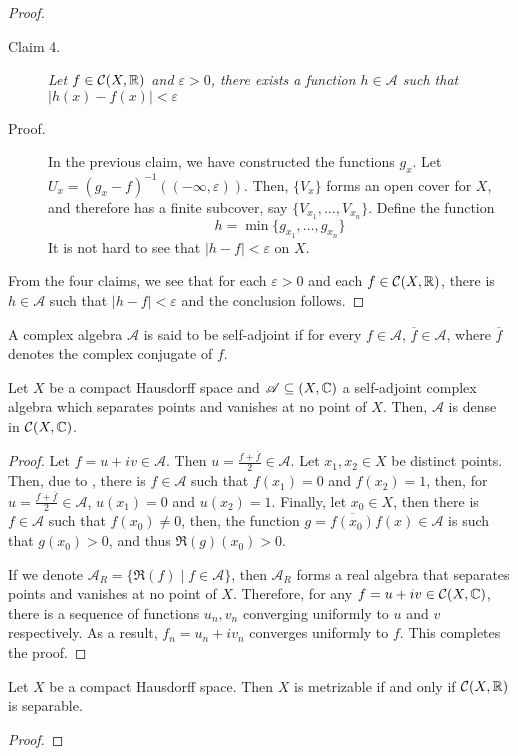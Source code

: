 \begin{proof}
\begin{description}
\item[Claim 4.]\itshape Let $f\in\mathcal C(X,\mathbb{R})$ and $\varepsilon > 0$, there exists a function $h\in\mathscr A$ such that $|h(x) - f(x)| < \varepsilon$\normalfont
\item[Proof.] In the previous claim, we have constructed the functions $g_x$. Let $U_x = (g_x - f)^{-1}((-\infty,\varepsilon))$. Then, $\{V_x\}$ forms an open cover for $X$, and therefore has a finite subcover, say $\{V_{x_1},\ldots,V_{x_n}\}$. Define the function 
\begin{equation*}
    h = \min\{g_{x_1},\ldots,g_{x_n}\}
\end{equation*}
It is not hard to see that $|h - f| < \varepsilon$ on $X$.
\end{description}

From the four claims, we see that for each $\varepsilon > 0$ and each $f\in\mathcal C(X,\mathbb{R})$, there is $h\in\mathscr A$ such that $|h - f| < \varepsilon$ and the conclusion follows.
\end{proof}

\begin{definition}
    A complex algebra $\mathscr A$ is said to be self-adjoint if for every $f\in\mathscr A$, $\overline f\in\mathscr A$, where $\overline f$ denotes the complex conjugate of $f$.
\end{definition}

\begin{theorem}
    Let $X$ be a compact Hausdorff space and $\mathscr A\subseteq\mathcal(X,\mathbb{C})$ a self-adjoint complex algebra which separates points and vanishes at no point of $X$. Then, $\mathscr A$ is dense in $\mathcal C(X,\mathbb{C})$.
\end{theorem}
\begin{proof}
    Let $f = u + iv\in\mathscr A$. Then $u = \frac{f + \overline f}{2}\in\mathscr A$. Let $x_1,x_2\in X$ be distinct points. Then, due to , there is $f\in\mathscr A$ such that $f(x_1) = 0$ and $f(x_2) = 1$, then, for $u = \frac{f + \overline f}{2}\in\mathscr A$, $u(x_1) = 0$ and $u(x_2) = 1$. Finally, let $x_0\in X$, then there is $f\in\mathscr A$ such that $f(x_0)\ne 0$, then, the function $g = \overline{f(x_0)}f(x)\in\mathscr A$ is such that $g(x_0) > 0$, and thus $\Re(g)(x_0) > 0$.

    If we denote $\mathscr A_R = \{\Re(f)\mid f\in\mathscr A\}$, then $\mathscr A_R$ forms a real algebra that separates points and vanishes at no point of $X$. Therefore, for any $f = u + iv\in\mathcal C(X,\mathbb{C})$, there is a sequence of functions $u_n,v_n$ converging uniformly to $u$ and $v$ respectively. As a result, $f_n = u_n + iv_n$ converges uniformly to $f$. This completes the proof.
\end{proof}

\begin{theorem}
    Let $X$ be a compact Hausdorff space. Then $X$ is metrizable if and only if $\mathcal C(X,\mathbb{R})$ is separable.
\end{theorem}
\begin{proof}
    
\end{proof}